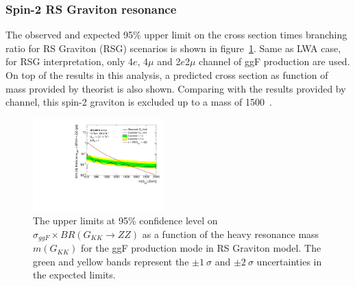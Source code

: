 \subsubsection{Spin-2 RS Graviton resonance}

The observed and expected 95\% upper limit on the cross section times branching ratio for RS Graviton (RSG) scenarios is shown in figure~\ref{fig:RSGlimits_ggF_201518}.
Same as LWA case, for RSG interpretation, only 4$e$, 4$\mu$ and 2$e$2$\mu$ channel of ggF production are used.
On top of the results in this analysis, a predicted cross section as function of mass provided by theorist is also shown.
Comparing with the results provided by \llll channel, this spin-2 graviton is excluded up to a mass of 1500~\gev.

\begin{figure}[h]
    \begin{center}
    \includegraphics[width=0.45\textwidth]{figures/HMHZZ/results/Limits_RSG.pdf}
    \end{center}
    \caption{The upper limits at 95\% confidence level on $\sigma_{ggF} \times BR(G_{KK}\rightarrow ZZ)$
    as a function of the heavy resonance mass $m(G_{KK})$ for the ggF production mode in RS Graviton model.
    The green and yellow bands represent the $\pm 1~\sigma$ and $\pm 2~\sigma$ uncertainties in the expected limits.
  }
    \label{fig:RSGlimits_ggF_201518}
\end{figure}

